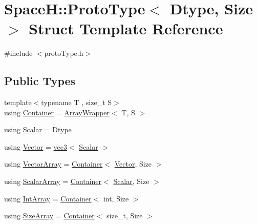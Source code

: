 \hypertarget{struct_space_h_1_1_proto_type}{}\section{SpaceH\+:\+:Proto\+Type$<$ Dtype, Size $>$ Struct Template Reference}
\label{struct_space_h_1_1_proto_type}


{\ttfamily \#include $<$proto\+Type.\+h$>$}

\subsection*{Public Types}
\begin{DoxyCompactItemize}
\item 
{\footnotesize template$<$typename T , size\+\_\+t S$>$ }\\using \mbox{\hyperlink{struct_space_h_1_1_proto_type_a60ee86c74f6f9ebfa78936f6dc1d2b07}{Container}} = \mbox{\hyperlink{struct_space_h_1_1_array_wrapper}{Array\+Wrapper}}$<$ T, S $>$
\item 
using \mbox{\hyperlink{struct_space_h_1_1_proto_type_af3c8245d83d9db64749882920de5c274}{Scalar}} = Dtype
\item 
using \mbox{\hyperlink{struct_space_h_1_1_proto_type_a316b81f4660b2b4fab14a8e1f23b6089}{Vector}} = \mbox{\hyperlink{struct_space_h_1_1vec3}{vec3}}$<$ \mbox{\hyperlink{struct_space_h_1_1_proto_type_af3c8245d83d9db64749882920de5c274}{Scalar}} $>$
\item 
using \mbox{\hyperlink{struct_space_h_1_1_proto_type_a622b8e122b33bb4966a02299fb7b82d6}{Vector\+Array}} = \mbox{\hyperlink{struct_space_h_1_1_proto_type_a60ee86c74f6f9ebfa78936f6dc1d2b07}{Container}}$<$ \mbox{\hyperlink{struct_space_h_1_1_proto_type_a316b81f4660b2b4fab14a8e1f23b6089}{Vector}}, Size $>$
\item 
using \mbox{\hyperlink{struct_space_h_1_1_proto_type_a09ef91dc8a37a044c403f5a833044725}{Scalar\+Array}} = \mbox{\hyperlink{struct_space_h_1_1_proto_type_a60ee86c74f6f9ebfa78936f6dc1d2b07}{Container}}$<$ \mbox{\hyperlink{struct_space_h_1_1_proto_type_af3c8245d83d9db64749882920de5c274}{Scalar}}, Size $>$
\item 
using \mbox{\hyperlink{struct_space_h_1_1_proto_type_ad9105b93d029a9d231bc31ddcfd7dbd9}{Int\+Array}} = \mbox{\hyperlink{struct_space_h_1_1_proto_type_a60ee86c74f6f9ebfa78936f6dc1d2b07}{Container}}$<$ int, Size $>$
\item 
using \mbox{\hyperlink{struct_space_h_1_1_proto_type_abb1c3c7a06f24576cc47636441331972}{Size\+Array}} = \mbox{\hyperlink{struct_space_h_1_1_proto_type_a60ee86c74f6f9ebfa78936f6dc1d2b07}{Container}}$<$ size\+\_\+t, Size $>$

\end{DoxyCompactItemize}
